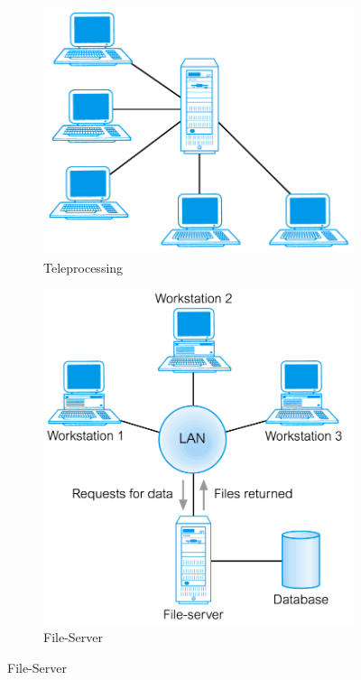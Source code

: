 \documentclass[a4paper,12pt]{article}
\begin{document}
\begin{figure}[H]
\centering
\begin{subfigure}{.49\textwidth}
  \centering
  \includegraphics[width=.9\linewidth]{img/Teleprocessing.png}
  \caption{Teleprocessing}
  \label{fig:Teleprocessing}
\end{subfigure}
\begin{subfigure}{.49\textwidth}
  \centering
  \includegraphics[width=.9\linewidth]{img/FileServer.png}
  \caption{File-Server}
  \label{fig:FileServer}

\end{subfigure}
\end{figure}
\end{document}
